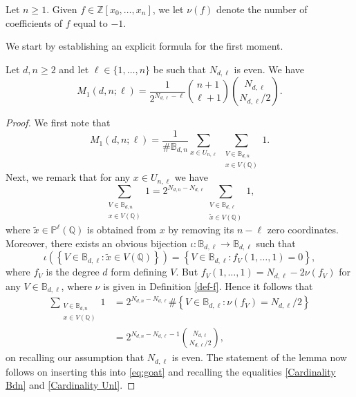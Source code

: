 \documentclass[11pt, reqno]{amsart}
\numberwithin{equation}{section}
\newcommand{\QQ}{\mathbb{Q}}
\newcommand{\ZZ}{\mathbb{Z}}
\renewcommand{\geq}{\geqslant}
\begin{document}
\begin{definition}\label{def-f}
Let $n\geq 1$. Given $f\in \ZZ[x_0,\dots,x_n]$, we let $\nu(f)$ denote the number of coefficients of $f$ equal to $-1$.
\end{definition}

We start by establishing an explicit formula for the first moment.

\begin{lemma}
\label{Lemma first moment}
Let $d, n \geq 2$ and let $\ell \in \{1, \dots, n\}$ be such that $N_{d,\ell}$ is even. We have
\begin{equation*}
M_1(d,n;\ell) = \frac1{2^{N_{d,\ell}-\ell}}  \binom{n+1}{\ell+1}\binom{N_{d,\ell}}{N_{d,\ell}/2}.
\end{equation*}
\end{lemma}

\begin{proof}
We first note that
\begin{equation}\label{eq:goat}
M_1(d,n;\ell) = \frac1{\# \mathbb{B}_{d,n}} \sum_{x \in U_{n,\ell}} \ \sum_{\substack{V \in \mathbb{B}_{d,n} \\ x \in V(\mathbb{Q})}} 1.
\end{equation}
Next, we remark that for any $x \in U_{n,\ell}$ we have 
$$
\sum_{\substack{V \in \mathbb{B}_{d,n} \\ x \in V(\mathbb{Q})}} 1=
2^{N_{d,n}-N_{d,\ell}}\sum_{\substack{V \in \mathbb{B}_{d,\ell} \\ \tilde x \in V(\mathbb{Q})}} 1,
$$
where $\tilde x\in \mathbb{P}^\ell(\QQ)$ is obtained from $x$ by removing its $n-\ell$ zero coordinates. 
Moreover, there exists an obvious bijection $\iota: \mathbb{B}_{d,\ell}\to \mathbb{B}_{d,\ell}$ such that 
$$
\iota \left(\left\{
V \in \mathbb{B}_{d,\ell}: \tilde x \in V(\mathbb{Q})\right\}\right)=
\left\{
V \in \mathbb{B}_{d,\ell}: f_V(1,\dots,1)=0\right\},
$$
where $f_V$ is the degree $d$ form defining $V$.
But $f_V(1,\dots,1)=N_{d,\ell}-2\nu(f_V)$ for any 
$V \in \mathbb{B}_{d,\ell}$, where $\nu$ is given in Definition \ref{def-f}. Hence it follows that 
\begin{equation}\label{eq:3.2}
\begin{split}
\sum_{\substack{V \in \mathbb{B}_{d,n} \\ x \in V(\mathbb{Q})}} 1
&=
2^{N_{d,n}-N_{d,\ell}}
\#\left\{
V \in \mathbb{B}_{d,\ell}: \nu(f_V)=N_{d,\ell}/2\right\}\\
&=2^{N_{d,n}-N_{d,\ell}-1} \binom{N_{d,\ell}}{N_{d,\ell}/2},
\end{split}
\end{equation}
on recalling our assumption that  $N_{d,\ell}$ is even.
The statement of the lemma now follows on inserting this into \eqref{eq:goat} and recalling 
the equalities \eqref{Cardinality Bdn} and \eqref{Cardinality Unl}.
\end{proof}
\end{document}
